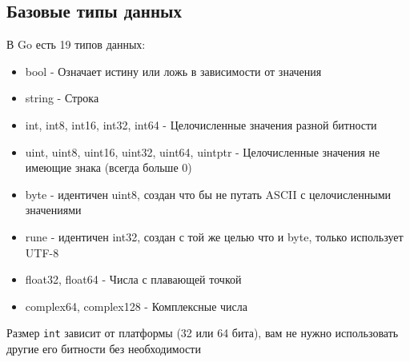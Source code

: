 \subsection{Базовые типы данных}
В Go есть 19 типов данных:
\begin{itemize}
    \item bool - Означает истину или ложь в зависимости от значения
    \item string - Строка
    \item int, int8, int16, int32, int64 - Целочисленные значения разной битности
    \item uint, uint8, uint16, uint32, uint64, uintptr - Целочисленные значения не имеющие знака (всегда больше 0)
    \item byte - идентичен uint8, создан что бы не путать ASCII с целочисленными значениями
    \item rune - идентичен int32, создан с той же целью что и byte, только использует UTF-8
    \item float32, float64 - Числа с плавающей точкой
    \item complex64, complex128 - Комплексные числа
\end{itemize}

Размер \verb|int| зависит от платформы (32 или 64 бита), вам не нужно использовать другие его битности без необходимости
